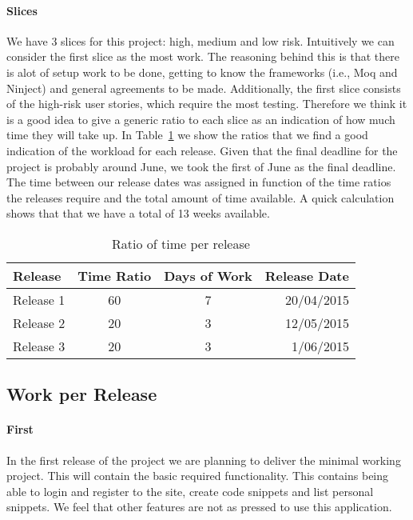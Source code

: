 \documentclass[10pt,a4paper,BCOR12mm, headexclude, footexclude,
  twoside, openright]{scrartcl}
\numberwithin{equation}{section} %
\numberwithin{figure}{section} %
\numberwithin{table}{section} %
\begin{document}
\paragraph{Slices}
We have 3 slices for this project: high, medium and low risk. Intuitively we can
consider the first slice as the most work. The reasoning behind this is that
there is alot of setup work to be done, getting to know the frameworks (i.e.,
Moq and Ninject) and general agreements to be made. Additionally, the first slice consists of the high-risk user stories, which require the most testing. Therefore we think it is a
good idea to give a generic ratio to each slice as an indication of how much
time they will take up. In Table~\ref{tbl:ratios} we show the ratios that we
find a good indication of the workload for each release. Given that the final
deadline for the project is probably around June, we took the first of June as
the final deadline. The time between our release dates was assigned in function of the time ratios the releases require and the total amount of time available. A quick calculation shows that that we have a total of 13
weeks available.
\begin{table}[h]
  \centering
  \label{tbl:ratios}
  \caption{Ratio of time per release}
  \begin{tabular}{| l| c| c| r | }
    \hline
    Release   & Time Ratio & Days of Work & Release Date \\
    \hline
    Release 1 & 60         & 7            & 20/04/2015 \\         
    Release 2 & 20         & 3            & 12/05/2015 \\
    Release 3 & 20         & 3            & 1/06/2015 \\
    \hline
  \end{tabular}
\end{table}

\subsection{Work per Release}
\paragraph{First} In the first release of the project we are planning to deliver the minimal
working project. This will contain the basic required functionality. This
contains being able to login and register to the site, create code snippets and
list personal snippets. We feel that other features are not as pressed to use this application.
\end{document}
